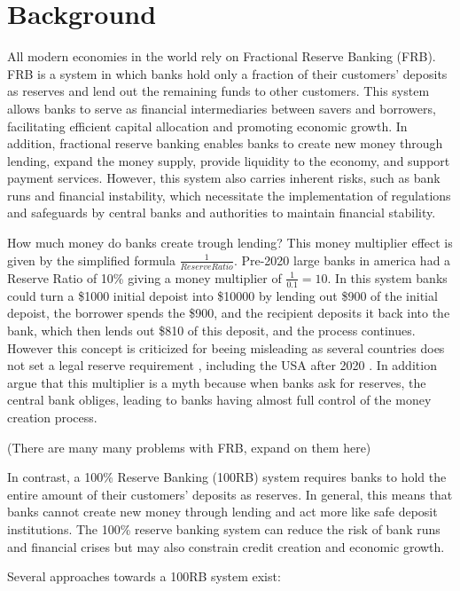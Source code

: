 \section{Background}
All modern economies in the world rely on Fractional Reserve Banking (FRB). 
FRB is a system in which banks hold only a fraction of their customers' deposits as reserves and lend out the remaining funds to other customers. 
This system allows banks to serve as financial intermediaries between savers and borrowers, 
facilitating efficient capital allocation and promoting economic growth. 
In addition, fractional reserve banking enables banks to create new money through lending, expand the money supply, provide liquidity to the economy, 
and support payment services. However, this system also carries inherent risks, such as bank runs and financial instability, 
which necessitate the implementation of regulations and safeguards by central banks and authorities to maintain financial stability. 

How much money do banks create trough lending? This money multiplier effect is given by the simplified formula $\frac{1}{Reserve Ratio}$. 
Pre-2020 large banks in america had a Reserve Ratio of 10\% \cite{FRBinvestopedia} giving a money multiplier of $\frac{1}{0.1}=10$. In this system banks could turn a \$1000 initial depoist into \$10000 by lending out \$900 of the initial depoist, the borrower spends the \$900, and the recipient deposits it back into the bank, which then lends out \$810 of this deposit, and the process continues.
However this concept is criticized for beeing misleading as several countries does not set a legal reserve requirement \cite{chicagorevisited}, including the USA after 2020 \cite{FRBinvestopedia}. In addition \textcite{chicagorevisited} argue that this multiplier is a myth because when banks ask for reserves, the central bank obliges, leading to banks having almost full control of the money creation process.

(There are many many problems with FRB, expand on them here)

In contrast, a 100\% Reserve Banking (100RB) system requires banks to hold the entire amount of their customers' deposits as reserves. In general, this means that banks cannot create new money through lending and act more like safe deposit institutions. The 100\% reserve banking system can reduce the risk of bank runs and financial crises but may also constrain credit creation and economic growth. 

Several approaches towards a 100RB system exist:

